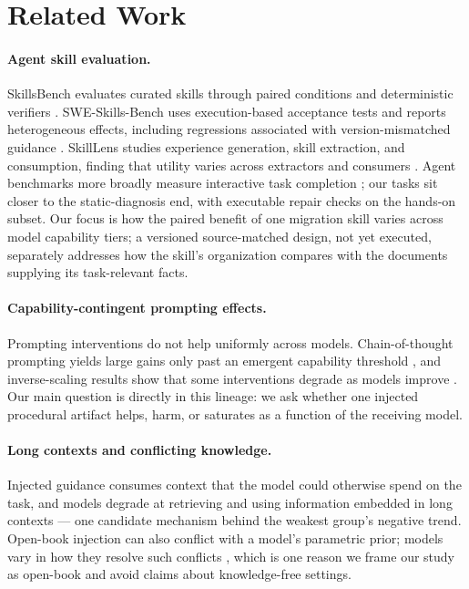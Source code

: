 \documentclass[11pt]{article}
\begin{document}
\section{Related Work}
\label{sec:related}

\paragraph{Agent skill evaluation.}
SkillsBench evaluates curated skills through paired conditions and deterministic verifiers \citep{skillsbench}.
SWE-Skills-Bench uses execution-based acceptance tests and reports heterogeneous effects, including regressions associated with version-mismatched guidance \citep{swe-skills-bench}.
SkillLens studies experience generation, skill extraction, and consumption, finding that utility varies across extractors and consumers \citep{skilllens}.
Agent benchmarks more broadly measure interactive task completion \citep{swe-bench,agentbench}; our tasks sit closer to the static-diagnosis end, with executable repair checks on the hands-on subset.
Our focus is how the paired benefit of one migration skill varies across model capability tiers; a versioned source-matched design, not yet executed, separately addresses how the skill's organization compares with the documents supplying its task-relevant facts.

\paragraph{Capability-contingent prompting effects.}
Prompting interventions do not help uniformly across models.
Chain-of-thought prompting yields large gains only past an emergent capability threshold \citep{cot-prompting}, and inverse-scaling results show that some interventions degrade as models improve \citep{inverse-scaling}.
Our main question is directly in this lineage: we ask whether one injected procedural artifact helps, harm, or saturates as a function of the receiving model.

\paragraph{Long contexts and conflicting knowledge.}
Injected guidance consumes context that the model could otherwise spend on the task, and models degrade at retrieving and using information embedded in long contexts \citep{lost-in-the-middle} --- one candidate mechanism behind the weakest group's negative trend.
Open-book injection can also conflict with a model's parametric prior; models vary in how they resolve such conflicts \citep{knowledge-conflicts}, which is one reason we frame our study as open-book and avoid claims about knowledge-free settings.
\end{document}
